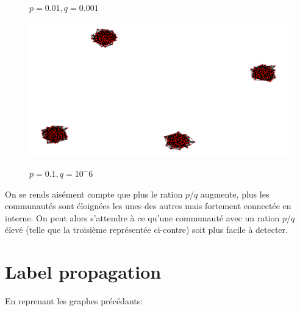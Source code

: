\documentclass{report}
\begin{document}
\begin{center}
\begin{figure}[!h]
    \caption*{$p=0.01, q=0.001$}
  \end{figure}
  \begin{figure}[!h]
    \centering
    \includegraphics[width=0.3\paperwidth]{assets/01000001.png}\\
    \caption*{$p=0.1, q=10^-6$}
  \end{figure}
\end{center}

On se rends aisément compte que plus le ration $p/q$ augmente, plus les communautés sont éloignées les unes des autres mais fortement connectée en interne. On peut alors s'attendre à ce qu'une communauté avec un ration $p/q$ élevé (telle que la troisième représentée ci-contre) soit plus facile à detecter.

\section{Label propagation}
En reprenant les graphes précédants:
\end{document}

